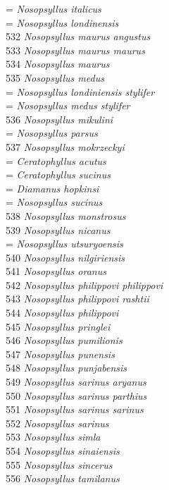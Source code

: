 \documentclass[
]{article}
\begin{document}
= \emph{Nosopsyllus italicus}\\
= \emph{Nosopsyllus londinensis}\\
532 \emph{Nosopsyllus maurus angustus}\\
533 \emph{Nosopsyllus maurus maurus}\\
534 \emph{Nosopsyllus maurus}\\
535 \emph{Nosopsyllus medus}\\
= \emph{Nosopsyllus londiniensis stylifer}\\
= \emph{Nosopsyllus medus stylifer}\\
536 \emph{Nosopsyllus mikulini}\\
= \emph{Nosopsyllus parsus}\\
537 \emph{Nosopsyllus mokrzeckyi}\\
= \emph{Ceratophyllus acutus}\\
= \emph{Ceratophyllus sucinus}\\
= \emph{Diamanus hopkinsi}\\
= \emph{Nosopsyllus sucinus}\\
538 \emph{Nosopsyllus monstrosus}\\
539 \emph{Nosopsyllus nicanus}\\
= \emph{Nosopsyllus utsuryoensis}\\
540 \emph{Nosopsyllus nilgiriensis}\\
541 \emph{Nosopsyllus oranus}\\
542 \emph{Nosopsyllus philippovi philippovi}\\
543 \emph{Nosopsyllus philippovi rashtii}\\
544 \emph{Nosopsyllus philippovi}\\
545 \emph{Nosopsyllus pringlei}\\
546 \emph{Nosopsyllus pumilionis}\\
547 \emph{Nosopsyllus punensis}\\
548 \emph{Nosopsyllus punjabensis}\\
549 \emph{Nosopsyllus sarinus aryanus}\\
550 \emph{Nosopsyllus sarinus parthius}\\
551 \emph{Nosopsyllus sarinus sarinus}\\
552 \emph{Nosopsyllus sarinus}\\
553 \emph{Nosopsyllus simla}\\
554 \emph{Nosopsyllus sinaiensis}\\
555 \emph{Nosopsyllus sincerus}\\
556 \emph{Nosopsyllus tamilanus}\\
\end{document}
